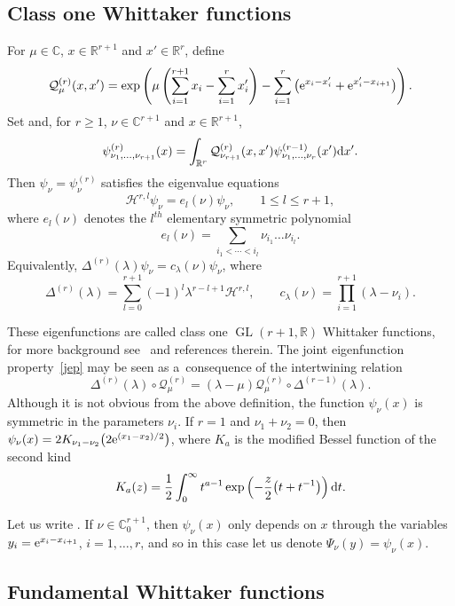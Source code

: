 \documentclass[pdftex]{sigma}
\theoremstyle{definition}
\newcommand{\C}{{\mathbb C}}
\newcommand\R{{\mathbb R}}
\renewcommand\H{{\mathcal H}}
\newcommand\Q{{\mathcal Q}}
\begin{document}
\subsection{Class one Whittaker functions}

For $\mu\in\C$, $x\in\R^{r+1}$ and $x'\in\R^r$, define
\[
\Q^{(r)}_\mu(x,x')=\exp\left( \mu \left(\sum_{i=1}^{r+1}x_i-\sum_{i=1}^r x'_i\right)
-\sum_{i=1}^r\big({\rm e}^{x_i-x'_i}+{\rm e}^{x'_i-x_{i+1}}\big)\right).\]
Set  and, for $r\ge 1$, $\nu\in\C^{r+1}$ and $x\in\R^{r+1}$,
\[
\psi^{(r)}_{\nu_1,\dots,\nu_{r+1}}(x)=
\int_{\R^r} \Q^{(r)}_{\nu_{r+1}}(x,x') \psi^{(r-1)}_{\nu_1,\dots,\nu_{r}}(x'){\rm d}x'.
\]
Then $\psi_\nu=\psi^{(r)}_\nu$ satisfies the eigenvalue equations
\begin{equation}\label{jep} \H^{r,l} \psi_\nu = e_l(\nu) \psi_\nu,\qquad 1\le l\le r+1,\end{equation}
where $e_l(\nu)$ denotes the $l^{th}$ elementary symmetric polynomial
\[
e_l(\nu)=\sum_{i_1<\cdots<i_l} \nu_{i_1}\dots\nu_{i_l}.
\]
Equivalently,
$\Delta^{(r)}(\lambda) \psi_\nu = c_\lambda(\nu) \psi_\nu$,
where
\[\Delta^{(r)}(\lambda) = \sum_{l=0}^{r+1} (-1)^l \lambda^{r-l+1} \H^{r,l},\qquad c_\lambda(\nu)=\prod_{i=1}^{r+1} (\lambda-\nu_i).\]

These eigenfunctions are called class one $\operatorname{GL}(r+1,\R)$ Whittaker functions,
for more background see~\cite{gklo} and references therein.
The joint eigenfunction property~\eqref{jep} may be seen as a~consequence
of the intertwining relation~\cite[Lemma 4.1]{gklo}
\[
\Delta^{(r)}(\lambda) \circ \Q^{(r)}_\mu = (\lambda-\mu) \Q^{(r)}_\mu \circ \Delta^{(r-1)}(\lambda).
\]
Although it is not obvious from the above definition,
the function $\psi_\nu(x)$ is symmetric in the parameters $\nu_i$.
If $r=1$ and $\nu_1+\nu_2=0$, then
$\psi_\nu(x)=2 K_{\nu_1-\nu_2}\bigl( 2 {\rm e}^{(x_1-x_2)/2}\bigr)$,
where $K_a$ is the modified Bessel function of the second kind
\[K_a(z)= \frac12 \int_0^\infty t^{a-1} \exp\left(-\frac{z}{2}\bigl(t+t^{-1}\bigr)\right) {\rm d}t.\]

Let us write \smash{$\C_0^{r+1}=\bigl\{\nu\in\C^{r+1}\mid \sum_i \nu_i=0\bigr\}$}.
If $\nu\in\C_0^{r+1}$, then $\psi_\nu(x)$ only depends on $x$
through the variables $y_i={\rm e}^{x_i-x_{i+1}}$, $i=1,\dots,r$, and
so in this case let us denote $\Psi_\nu(y)=\psi_\nu(x)$.

\subsection{Fundamental Whittaker functions}\label{fwf}
\end{document}
